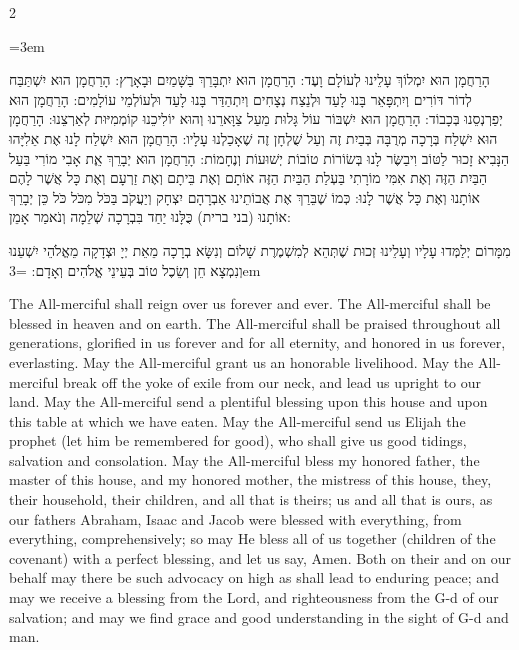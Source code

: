\documentclass[11pt, openany]{book}
\newenvironment{bilingual}{%
  \par\vspace{4pt}%
  \begin{paracol}{2}%
}{%
  \end{paracol}%
  \par\vspace{2pt}%
}
\newenvironment{hebrewcol}{%
  \switchcolumn[1]%
  \begingroup
  \RTL
  \hebrewfont\large
  \setstretch{1.4}%
  \emergencystretch=3em
  \tolerance=9999
  \parindent=0pt\relax
}{%
  \endRTL
  \endgroup
}
\newenvironment{englishcol}{%
  \switchcolumn[0]%
  \begingroup
  \setstretch{1.4}%
  \emergencystretch=3em
  \tolerance=9999
  \normalsize
  \rightskip=0.12in\relax
}{%
  \endgroup
}
\begin{document}
\begin{bilingual}
\begin{hebrewcol}
הָרַחֲמָן הוּא יִמְלוֹךְ עָלֵינוּ לְעוֹלָם וָעֶד: הָרַחֲמָן הוּא יִתְבָּרֵךְ בַּשָּׁמַיִם וּבָאָרֶץ: הָרַחֲמָן הוּא יִשְׁתַּבַּח לְדוֹר דּוֹרִים וְיִתְפָּאֵר בָּנוּ לָעַד וּלְנֵצַח נְצָחִים וְיִתְהַדַּר בָּנוּ לָעַד וּלְעוֹלְמֵי עוֹלָמִים: הָרַחֲמָן הוּא יְפַרְנְסֵנוּ בְּכָבוֹד: הָרַחֲמָן הוּא יִשְׁבּוֹר עוֹל גָּלוּת מֵעַל צַוָּארֵנוּ וְהוּא יוֹלִיכֵנוּ קוֹמְמִיּוּת לְאַרְצֵנוּ: הָרַחֲמָן הוּא יִשְׁלַח בְּרָכָה מְרֻבָּה בְּבַיִת זֶה וְעַל שֻׁלְחָן זֶה שֶׁאָכַלְנוּ עָלָיו: הָרַחֲמָן הוּא יִשְׁלַח לָנוּ אֶת אֵלִיָּהוּ הַנָּבִיא זָכוּר לַטּוֹב וִיבַשֶּׂר לָנוּ בְּשׂוֹרוֹת טוֹבוֹת יְשׁוּעוֹת וְנֶחָמוֹת: הָרַחֲמָן הוּא יְבָרֵךְ אֵֶת אָבִי מוֹרִי בַּעַל הַבַּיִת הַזֶּה וְאֶת אִמִּי מוֹרָתִי בַּעְלַת הַבַּיִת הַזֶּה אוֹתָם וְאֶת בֵּיתָם וְאֶת זַרְעָם וְאֶת כָּל אֲשֶׁר לָהֶם אוֹתָנוּ וְאֶת כָּל אֲשֶׁר לָנוּ: כְּמוֹ שֶׁבֵּרַךְ אֶת אֲבוֹתֵינוּ אַבְרָהָם יִצְחָק וְיַעֲקֹב בַּכֹּל מִכֹּל כֹּל כֵּן יְבָרֵךְ אוֹתָנוּ (בני ברית) כֻּלָּנוּ יַחַד בִּבְרָכָה שְׁלֵמָה וְנֹאמַר אָמֵן:

מִמָּרוֹם יְלַמְּדוּ עָלָיו וְעָלֵינוּ זְכוּת שֶׁתְּהֵא לְמִשְׁמֶרֶת שָׁלוֹם וְנִשָּׂא בְרָכָה מֵאֵת יְיָ וּצְדָקָה מֵאֱלֹהֵי יִשְׁעֵנוּ וְנִמְצָא חֵן וְשֵׂכֶל טוֹב בְּעֵינֵי אֱלֹהִים וְאָדָם:
\end{hebrewcol}
\begin{englishcol}
The All-merciful shall reign over us forever and ever. The All-merciful shall be blessed in heaven and on earth. The All-merciful shall be praised throughout all generations, glorified in us forever and for all eternity, and honored in us forever, everlasting. May the All-merciful grant us an honorable livelihood. May the All-merciful break off the yoke of exile from our neck, and lead us upright to our land. May the All-merciful send a plentiful blessing upon this house and upon this table at which we have eaten. May the All-merciful send us Elijah the prophet (let him be remembered for good), who shall give us good tidings, salvation and consolation. May the All-merciful bless my honored father, the master of this house, and my honored mother, the mistress of this house, they, their household, their children, and all that is theirs; us and all that is ours, as our fathers Abraham, Isaac and Jacob were blessed with everything, from everything, comprehensively; so may He bless all of us together (children of the covenant) with a perfect blessing, and let us say, Amen. Both on their and on our behalf may there be such advocacy on high as shall lead to enduring peace; and may we receive a blessing from the Lord, and righteousness from the G-d of our salvation; and may we find grace and good understanding in the sight of G-d and man.
\end{englishcol}
\end{bilingual}
\end{document}
